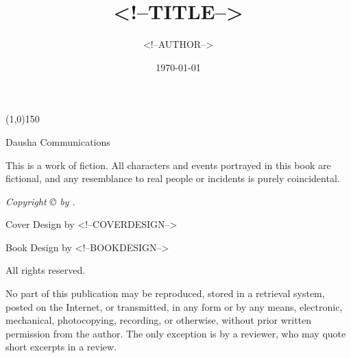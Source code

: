 \documentclass[11pt,twoside,makeidx]{memoir}
\title{<!--TITLE-->}
\author{<!--AUTHOR-->}
\date{\today}
\begin{document}
\frontmatter
  \begin{titlingpage}
  \pagestyle{empty}
  \begin{center}
  \vspace*{\fill}

  \HUGE\textbf{\textsf\thetitle}

  \vspace*{0.25in}
  \line(1,0){150}
  \vspace*{0.25in}

  \Large\textsf\theauthor

  \vspace*{\fill}

  \vspace*{\fill}
  \hspace*{\fill}\textsf{Dausha}\hspace*{\fill}\newline%
  \textsf{Communications}
  \end{center}
  \end{titlingpage}

  \vspace*{\fill}
  \pagestyle{empty}

  \par\noindent\emph{\thetitle}
  \newline
  
  \par\noindent This is a work of fiction. All characters and events portrayed in this
  book are fictional, and any resemblance to real people or incidents is
  purely coincidental.\newline

  \par\noindent\emph{Copyright \copyright{} \yearonly{} by \theauthor.}\newline
  
  \par\noindent Cover Design by <!--COVERDESIGN-->\newline

  \par\noindent Book Design by <!--BOOKDESIGN-->\newline

  \par\noindent All rights reserved.\newline

  \par\noindent No part of this publication may be reproduced, stored in a retrieval system, posted on the Internet, or transmitted, in any form or by any means, electronic, mechanical, photocopying, recording, or otherwise, without prior written permission from the author. The only exception is by a reviewer, who may quote short excerpts in a review.\newline
\end{document}

